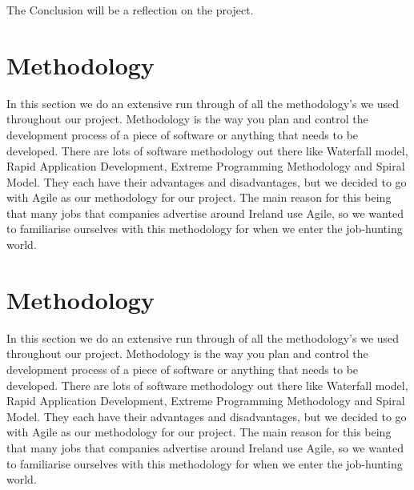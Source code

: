 The Conclusion will be a reflection on the project.


\chapter{Methodology}
In this section we do an extensive run through of all the methodology’s we used throughout our project. Methodology is the way you plan and control the development process of a piece of software or anything that needs to be developed. There are lots of software methodology out there like Waterfall model, Rapid Application Development, Extreme Programming Methodology and Spiral Model. They each have their advantages and disadvantages, but we decided to go with Agile as our methodology for our project. The main reason for this being that many jobs that companies advertise around Ireland use Agile, so we wanted to familiarise ourselves with this methodology for when we enter the job-hunting world.

\chapter{Methodology}
In this section we do an extensive run through of all the methodology’s we used throughout our project. Methodology is the way you plan and control the development process of a piece of software or anything that needs to be developed. There are lots of software methodology out there like Waterfall model, Rapid Application Development, Extreme Programming Methodology and Spiral Model. They each have their advantages and disadvantages, but we decided to go with Agile as our methodology for our project. The main reason for this being that many jobs that companies advertise around Ireland use Agile, so we wanted to familiarise ourselves with this methodology for when we enter the job-hunting world.

